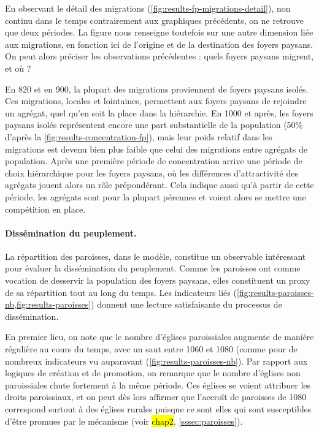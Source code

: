 En observant le détail des migrations (\cref{fig:results-fp-migrations-detail}), non continu dans le temps contrairement aux graphiques précédents, on ne retrouve que deux périodes.
La figure nous renseigne toutefois sur une autre dimension liée aux migrations, en fonction ici de l'origine et de la destination des foyers paysans.
On peut alors préciser les observations précédentes : quels foyers paysans migrent, et où ?

En 820 et en 900, la plupart des migrations proviennent de foyers paysans isolés.
Ces migrations, locales et lointaines, permettent aux foyers paysans de rejoindre un agrégat, quel qu'en soit la place dans la hiérarchie.
En 1000 et après, les foyers paysans isolés représentent encore une part substantielle de la population (50\% d'après la \cref{fig:results-concentration-fp}), mais leur poids relatif dans les migrations est devenu bien plus faible que celui des migrations entre agrégats de population.
Après une première période de concentration arrive une période de choix hiérarchique pour les foyers paysans, où les différences d'attractivité des agrégats jouent alors un rôle prépondérant.
Cela indique aussi qu'à partir de cette période, les agrégats sont pour la plupart pérennes et voient alors se mettre une compétition en place.

\paragraph{Dissémination du peuplement.}

La répartition des paroisses, dans le modèle, constitue un observable intéressant pour évaluer la dissémination du peuplement.
Comme les paroisses ont comme vocation de desservir la population des foyers paysans, elles constituent un proxy de sa répartition tout au long du temps.
Les indicateurs liés (\cref{fig:results-paroisses-nb,fig:results-paroisses}) donnent une lecture satisfaisante du processus de dissémination.

En premier lieu, on note que le nombre d'églises paroissiales augmente de manière régulière au cours du temps, avec un saut entre 1060 et 1080 (comme pour de nombreux indicateurs vu auparavant (\cref{fig:results-paroisses-nb}).
Par rapport aux logiques de création et de promotion, on remarque que le nombre d'églises non paroissiales chute fortement à la même période.
Ces églises se voient attribuer les droits paroissiaux, et on peut dès lors affirmer que l'accroît de paroisses de 1080 correspond surtout à des églises rurales puisque ce sont elles qui sont susceptibles d'être promues par le mécanisme (voir \hl{chap2}, \cref{sssec:paroisses}).


